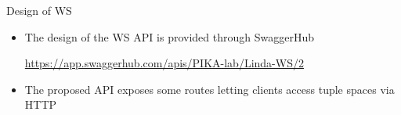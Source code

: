 \documentclass[presentation]{beamer}\mode<presentation>{\usetheme{AMSCesenaPurpleAndGold}}
\begin{document}
\begin{frame}[allowframebreaks]{Design of \linda{} WS}
    \begin{itemize}
        \item The design of the \linda{} WS \alert{API} is provided through SwaggerHub
        \begin{center}
            \url{https://app.swaggerhub.com/apis/PIKA-lab/Linda-WS/2}
        \end{center}

        \vspace{.3cm}

        \item The proposed API exposes some routes letting clients access tuple spaces via HTTP

        \framebreak







\end{itemize}
\end{frame}
\end{document}
